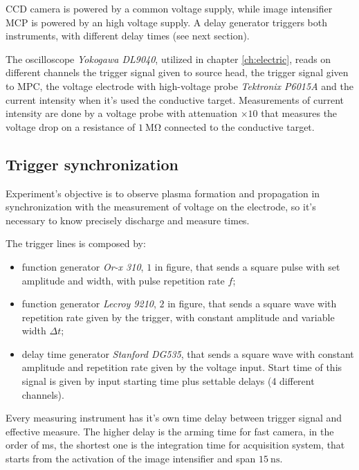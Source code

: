 CCD camera is powered by a common voltage supply, while image intensifier MCP is powered by an high voltage supply. A delay generator triggers both instruments, with different delay times (see next section).

The oscilloscope \emph{Yokogawa DL9040}, utilized in chapter \ref{ch:electric}, reads on different channels the trigger signal given to source head, the trigger signal given to MPC, the voltage electrode with high-voltage probe \emph{Tektronix P6015A} and the current intensity when it's used the conductive target. Measurements of current intensity are done by a voltage probe with attenuation $\times \num{10}$ that measures the voltage drop on a resistance of $\SI{1}{\mega\ohm}$ connected to the conductive target.

\subsection{Trigger synchronization}
Experiment's objective is to observe plasma formation and propagation in synchronization with the measurement of voltage on the electrode, so it's necessary to know precisely discharge and measure times.

The trigger lines is composed by:
\begin{itemize}
 \item function generator \emph{Or-x 310}, $1$ in figure, that sends a square pulse with set amplitude and width, with pulse repetition rate $f$;
 \item function generator \emph{Lecroy 9210}, $2$ in figure, that sends a square wave with repetition rate given by the trigger, with constant amplitude and variable width $\Delta t$;
 \item delay time generator \emph{Stanford DG535}, that sends a square wave with constant amplitude and repetition rate given by the voltage input. Start time of this signal is given by input starting time plus settable delays (4 different channels).
\end{itemize}

Every measuring instrument has it's own time delay between trigger signal and effective measure. The higher delay is the arming time for fast camera, in the order of \si{\milli\second}, the shortest one is the integration time for acquisition system, that starts from the activation of the image intensifier and span $\SI{15}{\nano\second}$.

